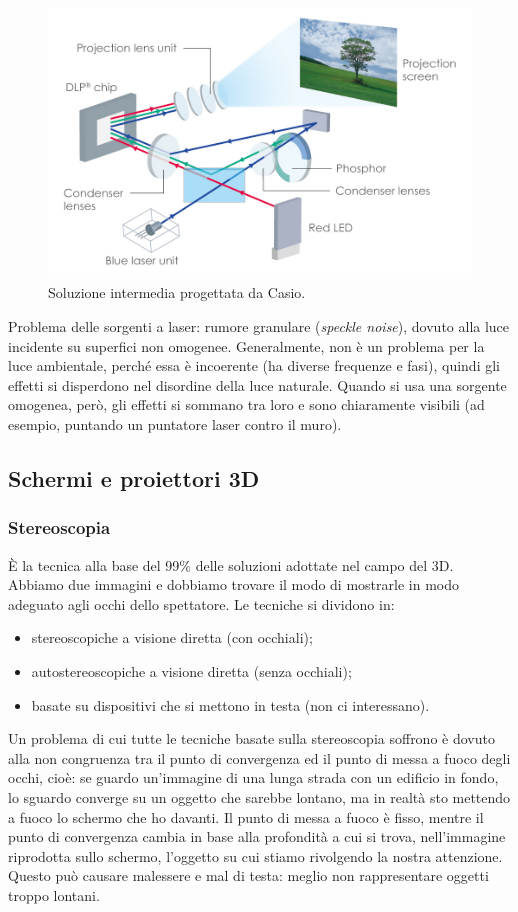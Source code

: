 \documentclass[a4paper,11pt]{article}
\begin{document}
\renewcommand{\thefigure}{4.27}
\begin{figure}[!h]
  \centering
    \includegraphics[scale=0.25]{images/4/casio.jpg}
    \caption{Soluzione intermedia progettata da Casio.}
\end{figure}

Problema delle sorgenti a laser: rumore granulare (\textit{speckle noise}), dovuto alla luce incidente su superfici non omogenee. Generalmente, non è un problema per la luce ambientale, perché
essa è incoerente (ha diverse frequenze e fasi), quindi gli effetti si disperdono nel disordine della luce naturale.
Quando si usa una sorgente omogenea, però, gli effetti si sommano tra loro e sono chiaramente visibili (ad esempio, puntando un puntatore laser contro il muro).

\subsection{Schermi e proiettori 3D}
\subsubsection{Stereoscopia}
È la tecnica alla base del 99\% delle soluzioni adottate nel campo del 3D. Abbiamo due immagini e dobbiamo trovare il modo di mostrarle in modo adeguato
agli occhi dello spettatore. Le tecniche si dividono in:
\begin{itemize}
    \item stereoscopiche a visione diretta (con occhiali);
    \item autostereoscopiche a visione diretta (senza occhiali);
    \item basate su dispositivi che si mettono in testa (non ci interessano).
\end{itemize}
Un problema di cui tutte le tecniche basate sulla stereoscopia soffrono è dovuto alla non congruenza tra il punto di convergenza ed il punto di messa a fuoco degli occhi,
cioè: se guardo un'immagine di una lunga strada con un edificio in fondo, lo sguardo converge su un oggetto che sarebbe lontano, ma in realtà sto mettendo a fuoco
lo schermo che ho davanti. Il punto di messa a fuoco è fisso, mentre il punto di convergenza cambia in base alla profondità a cui si trova, nell'immagine riprodotta sullo schermo, l'oggetto su cui stiamo rivolgendo
la nostra attenzione. Questo può causare malessere e mal di testa: meglio non rappresentare oggetti troppo lontani.
\end{document}
